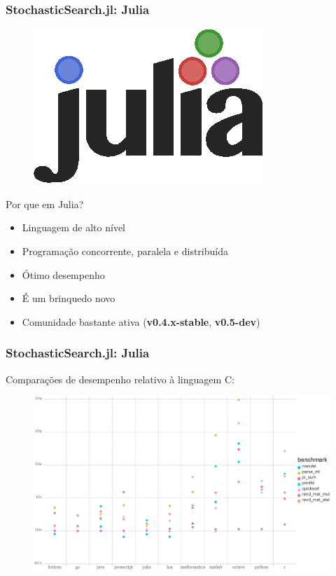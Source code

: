 \documentclass[10pt, compress]{beamer}
\begin{document}
\begin{frame}[fragile]
    \frametitle{StochasticSearch.jl: Julia}
    \begin{figure}[H]
        \centering
        \includegraphics[width=.24\textwidth]{julialogo}
    \end{figure}%
    Por que em Julia?
    \begin{itemize}
        \item Linguagem de \alert{alto nível}
        \item Programação \alert{concorrente}, \alert{paralela} e \alert{distribuída}
            \pause
        \item Ótimo \alert{desempenho}
            \pause
        \item É um brinquedo \alert{novo}
        \item Comunidade bastante \alert{ativa} (\textbf{v0.4.x-stable}, \textbf{v0.5-dev})
    \end{itemize}
    \let\thefootnote\relax{}
\end{frame}

\begin{frame}[fragile]
    \frametitle{StochasticSearch.jl: Julia}
    Comparações de desempenho relativo à linguagem \alert{C}:
    \begin{figure}[H]
        \centering
        \includegraphics[width=1\textwidth]{juliabenchmarks}
    \end{figure}%
    \let\thefootnote\relax{}
\end{frame}
\end{document}
